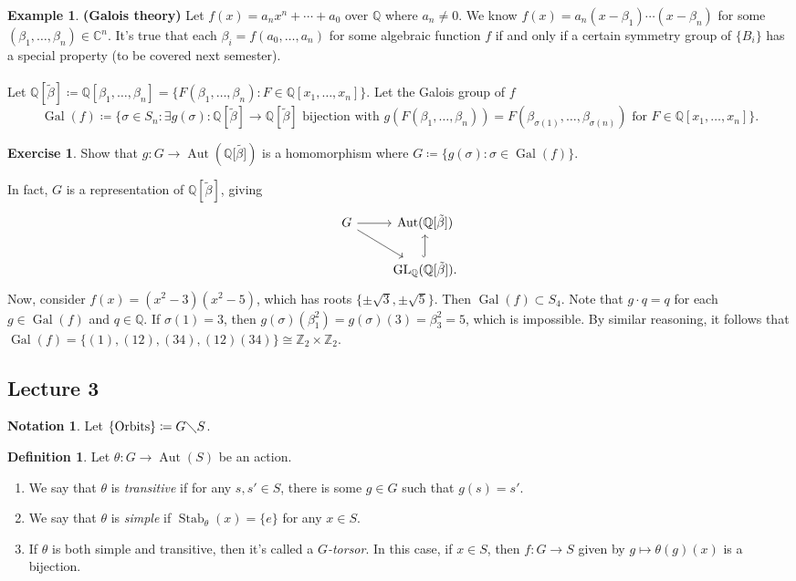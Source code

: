 \documentclass[10pt,letterpaper,cm]{nupset}
\theoremstyle{definition}
\newtheorem*{definition}{Definition}
\newtheorem{exmp}{Example}
\newtheorem*{notation}{Notation}
\newtheorem{exercise}{Exercise}
\newcommand{\C}{\mathbb C}
\newcommand{\Q}{\mathbb Q}
\newcommand{\Z}{\mathbb Z}
\newcommand{\1}{\mathbf{1}}
\newcommand{\0}{\vec 0}
\DeclareMathOperator*{\GL}{GL}
\DeclareMathOperator{\gal}{Gal}
\DeclareMathOperator{\aut}{Aut}
\DeclareMathOperator{\stab}{Stab}
\begin{document}
\begin{exmp}{\textbf{(Galois theory)}}
Let $f(x) = a_nx^n + \cdots + a_0$ over $\Q$ where $a_n \ne 0$. We know $f(x) = a_n(x-\beta_1)\cdots (x-\beta_n)$ for some $(\beta_1, \ldots, \beta_n) \in \C^n$. It's true that each $\beta_i = f(a_0, \ldots, a_n)$ for some algebraic function $f$  if and only if a certain symmetry group of $\{B_i\}$ has a special property (to be covered next semester).
\\ \\ Let $\Q[\tilde{\beta}]\coloneqq  \Q[\beta_1, \ldots, \beta_n] = \{F(\beta_1, \ldots, \beta_n) : F \in \Q[x_1, \ldots, x_n]\}$. Let the Galois group of $f$ $$\gal(f)\coloneqq  \{\sigma \in S_n : \exists g(\sigma) : \Q[\tilde{\beta}] \to \Q[\tilde{\beta}] \text{ bijection with } g(F(\beta_1, \ldots, \beta_n)) = F(\beta_{\sigma(1)}, \ldots, \beta_{\sigma(n)}) \text{ for } F \in \Q[x_1, \ldots, x_n]\}.$$

\begin{exercise}
Show that $g: G \to \aut(\Q[\tilde{\beta]})$ is a homomorphism where $G \coloneqq  \{g(\sigma): \sigma \in \gal(f)\}$.
\end{exercise}
In fact, $G$ is a representation of $\Q[\tilde{\beta}]$, giving
\[ \begin{tikzcd}
G \arrow{r} \arrow[swap]{dr} & \aut(\Q[\tilde{\beta}]) \\%
 & \GL_\Q(\Q[\tilde{\beta}]) \arrow[hookrightarrow]{u}.
\end{tikzcd}
\]
Now, consider $f(x) = (x^2 -3)(x^2 -5)$, which has roots $\{\pm \sqrt{3}, \pm \sqrt{5}\}$. Then $\gal(f) \subset S_4$. Note that $g\cdot q= q$ for each $g \in \gal(f)$ and $q\in \Q$. If $\sigma(1) =3$, then $g(\sigma)(\beta_1^2) = g(\sigma)  (3) = \beta_3^2 = 5$, which is impossible. By similar reasoning, it follows that $\gal(f) = \{(1), (1 2), (3 4), (1 2)(3 4)\} \cong \Z_2 \times \Z_2$.
\end{exmp}

\subsection{Lecture 3}

\begin{notation}
Let $\{\text{Orbits}\} \coloneqq  G \diagdown S$.
\end{notation}

\begin{definition} Let $\theta: G \to \aut(S)$ be an action.
\begin{enumerate}
\item We say that  $\theta$ is \textit{transitive} if for any $s, s' \in S$, there is some $g \in G$ such that $g(s) = s'$. 
\item We say that $\theta$ is \textit{simple} if $\stab_\theta(x) = \{e\}$ for any $x \in S$.
\item If $\theta$ is both simple and transitive, then it's called a \textit{$G$-torsor}. In this case, if $x \in S$, then $f: G \to S$ given by $g\mapsto \theta(g)(x)$ is a bijection.
\end{enumerate}
\end{definition}
\end{document}

